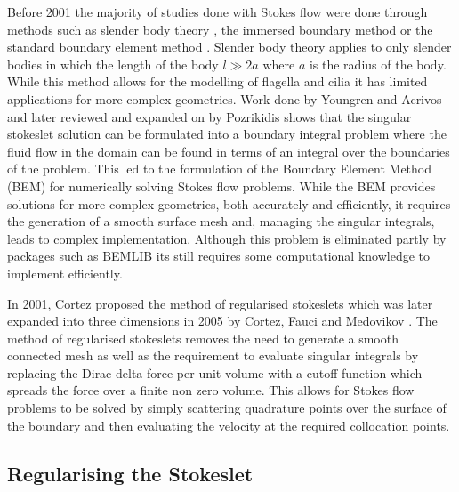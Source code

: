 Before 2001 the majority of studies done with Stokes flow were done through methods such as slender body theory \cite{Walker2020AFilaments,Johnson1980AnFlow}, the immersed boundary method  \cite{Fauci1993,Maxian2020,Fauci1995,Peskin2002} or the standard boundary element method \cite{Acrivos1975StokesSolution,Pozrikidis1992BoundaryFlow,Tran-Cong1987APropulsion}. Slender body theory applies to only slender bodies in which the length of the body $l \gg 2a$ where $a$ is the radius of the body. While this method allows for the modelling of flagella and cilia it has limited applications for more complex geometries. Work done by Youngren and Acrivos \cite{Acrivos1975StokesSolution} and later reviewed and expanded on by Pozrikidis \cite{Pozrikidis1992BoundaryFlow} shows that the singular stokeslet solution can be formulated into a boundary integral problem where the fluid flow in the domain can be found in terms of an integral over the boundaries of the problem. This led to the formulation of the Boundary Element Method (BEM) for numerically solving Stokes flow problems. While the BEM provides solutions for more complex geometries, both accurately and efficiently, it requires the generation of a smooth surface mesh and, managing the singular integrals, leads to complex implementation. Although this problem is eliminated partly by packages such as BEMLIB \cite{Pozrikidis2002ABEMLIB} its still requires some computational knowledge to implement efficiently.

In 2001, Cortez \cite{Cortez2001} proposed the method of regularised stokeslets which was later expanded into three dimensions in 2005 by Cortez, Fauci and Medovikov \cite{Cortez2005}. The method of regularised stokeslets removes the need to generate a smooth connected mesh as well as the requirement to evaluate singular integrals by replacing the Dirac delta force per-unit-volume with a cutoff function which spreads the force over a finite non zero volume. This allows for Stokes flow problems to be solved by simply scattering quadrature points over the surface of the boundary and then evaluating the velocity at the required collocation points.

\subsection{Regularising the Stokeslet}

